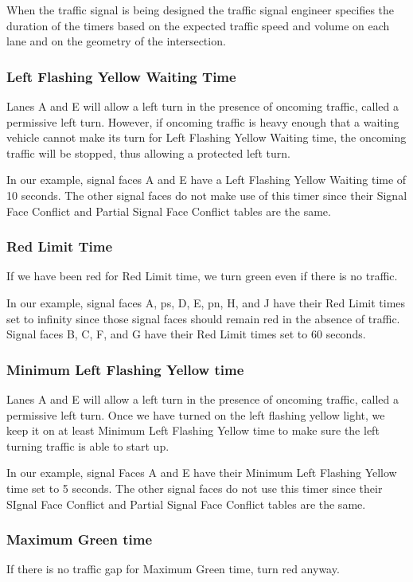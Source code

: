 \documentclass[letterpaper,twoside]{article}
\begin{document}
When the traffic signal is being designed the traffic signal engineer specifies
the duration of the timers based on the expected traffic speed and volume on
each lane and on the geometry of the intersection.

\subsubsection{Left Flashing Yellow Waiting Time}
Lanes A and E will allow a left turn in the presence of oncoming traffic,
called a permissive left turn.
However, if oncoming traffic is heavy enough that a waiting vehicle
cannot make its turn for Left Flashing Yellow Waiting time, the oncoming
traffic will be stopped, thus allowing a protected left turn.

In our example, signal faces A and E have a Left Flashing Yellow Waiting time
of 10 seconds.  The other signal faces do not make use of this timer
since their Signal Face Conflict and Partial Signal Face
Conflict tables are the same.

\subsubsection{Red Limit Time}
If we have been red for Red Limit time, we turn green even if there is
no traffic.

In our example, signal faces A, ps, D, E, pn, H, and J have their
Red Limit times set to infinity since those signal faces should
remain red in the absence of traffic.
Signal faces B, C, F, and G have their Red Limit times set to 60 seconds.

\subsubsection{Minimum Left Flashing Yellow time}
Lanes A and E will allow a left turn in the presence of oncoming traffic,
called a permissive left turn.  Once we have turned on the left flashing
yellow light, we keep it on at least Minimum Left Flashing Yellow time
to make sure the left turning traffic is able to start up.

In our example, signal Faces A and E have their Minimum Left Flashing Yellow
time set to 5 seconds.  The other signal faces do not use this timer
since their SIgnal Face Conflict and Partial Signal Face Conflict
tables are the same.

\subsubsection{Maximum Green time}
If there is no traffic gap for Maximum Green time, turn red anyway.
\end{document}
